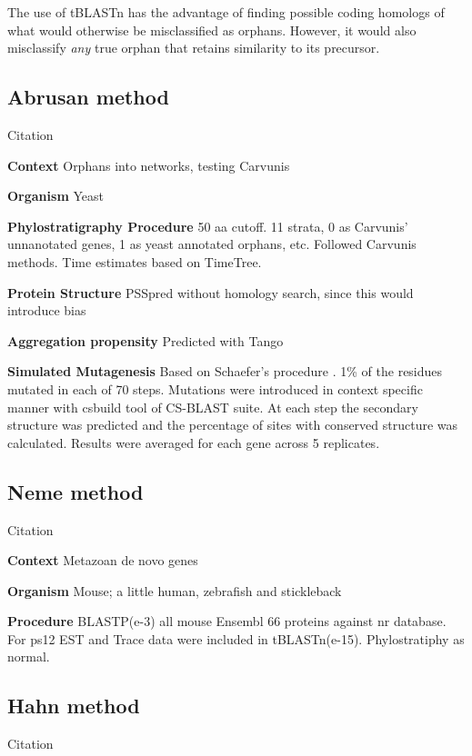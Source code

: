   The use of tBLASTn has the advantage of finding possible coding homologs of
  what would otherwise be misclassified as orphans. However, it would also
  misclassify \textit{any} true orphan that retains similarity to its
  precursor.

\subsection{Abrusan method}

Citation \cite{abrusan_integration_2013}

\textbf{Context} Orphans into networks, testing Carvunis

\textbf{Organism} Yeast

\textbf{Phylostratigraphy Procedure} 50 aa cutoff. 11 strata, 0 as Carvunis' unnanotated
genes, 1 as yeast annotated orphans, etc. Followed Carvunis methods. Time
estimates based on TimeTree.

\textbf{Protein Structure} PSSpred without homology search, since this
would introduce bias

\textbf{Aggregation propensity} Predicted with Tango

\textbf{Simulated Mutagenesis} Based on Schaefer's procedure
\cite{schaefer_protein_2010}. 1\% of the residues mutated in each of 70
steps. Mutations were introduced in context specific manner with csbuild
tool of CS-BLAST suite. At each step the secondary structure was predicted
and the percentage of sites with conserved structure was calculated.
Results were averaged for each gene across 5 replicates.

\subsection{Neme method}

Citation \cite{neme_phylogenetic_2013}

\textbf{Context} Metazoan de novo genes

\textbf{Organism} Mouse; a little human, zebrafish and stickleback

\textbf{Procedure} BLASTP(e-3) all mouse Ensembl 66 proteins against nr
database. For ps12 EST and Trace data were included in tBLASTn(e-15).
Phylostratiphy as normal.

\subsection{Hahn method}

Citation \cite{hahn_gene_2007}

